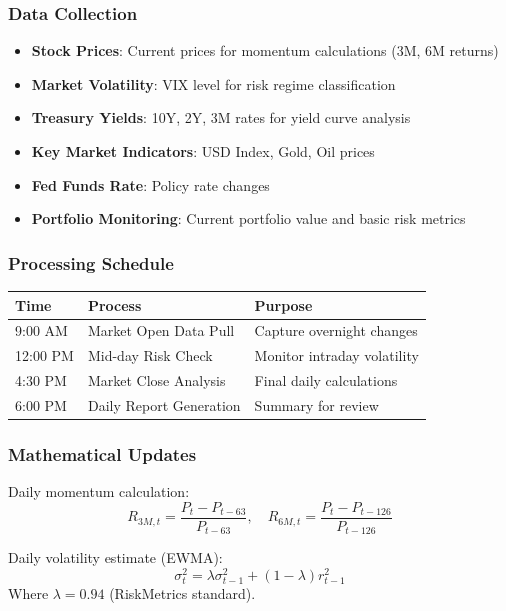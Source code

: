 \documentclass[12pt,a4paper]{article}
\begin{document}
\subsubsection{Data Collection}
\begin{itemize}
    \item \textbf{Stock Prices}: Current prices for momentum calculations (3M, 6M returns)
    \item \textbf{Market Volatility}: VIX level for risk regime classification  
    \item \textbf{Treasury Yields}: 10Y, 2Y, 3M rates for yield curve analysis
    \item \textbf{Key Market Indicators}: USD Index, Gold, Oil prices
    \item \textbf{Fed Funds Rate}: Policy rate changes
    \item \textbf{Portfolio Monitoring}: Current portfolio value and basic risk metrics
\end{itemize}

\subsubsection{Processing Schedule}
\begin{longtable}{|p{3cm}|p{4cm}|p{6cm}|}
\hline
\textbf{Time} & \textbf{Process} & \textbf{Purpose} \\
\hline
9:00 AM & Market Open Data Pull & Capture overnight changes \\
\hline
12:00 PM & Mid-day Risk Check & Monitor intraday volatility \\
\hline
4:30 PM & Market Close Analysis & Final daily calculations \\
\hline
6:00 PM & Daily Report Generation & Summary for review \\
\hline
\end{longtable}

\subsubsection{Mathematical Updates}
Daily momentum calculation:
\begin{equation}
R_{3M,t} = \frac{P_t - P_{t-63}}{P_{t-63}}, \quad R_{6M,t} = \frac{P_t - P_{t-126}}{P_{t-126}}
\end{equation}

Daily volatility estimate (EWMA):
\begin{equation}
\sigma_t^2 = \lambda \sigma_{t-1}^2 + (1-\lambda) r_{t-1}^2
\end{equation}
Where $\lambda = 0.94$ (RiskMetrics standard).
\end{document}
